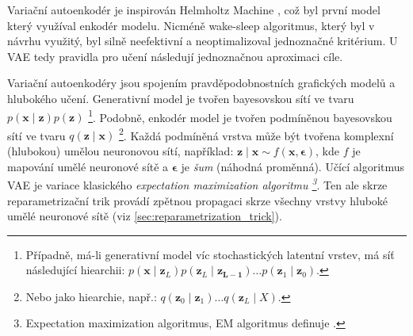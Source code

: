 Variační autoenkodér je inspirován Helmholtz Machine \cite{Dayan1995}, což byl první model který využíval enkodér modelu.
Nicméně wake-sleep algoritmus, který byl v návrhu využitý, byl silně neefektivní a neoptimalizoval jednoznačné kritérium.
U VAE tedy pravidla pro učení následují jednoznačnou aproximaci cíle. \cite{Kingma2019}

Variační autoenkodéry jsou spojením pravděpodobnostních grafických modelů a hlubokého učení.
Generativní model je tvořen bayesovskou sítí ve tvaru $p(\mathbf{x}\mid\mathbf{z})p(\mathbf{z})$
\footnote{Případně, má-li generativní model víc stochastických latentní vrstev, má síť následující hiearchii: $p(\mathbf{x}\mid\mathbf{z}_L) p(\mathbf{z}_L\mid\mathbf{z_{L-1}}) \dots p(\mathbf{z}_1\mid\mathbf{z}_0)$.}.
Podobně, enkodér model je tvořen podmíněnou bayesovskou sítí ve tvaru $q(\mathbf{z}\mid\mathbf{x})$
\footnote{Nebo jako hiearchie, např.: $q(\mathbf{z}_0\mid\mathbf{z}_1) \dots q(\mathbf{z}_L \mid X)$.}.
Každá podmíněná vrstva může být tvořena komplexní (hlubokou) umělou neuronovou sítí, například: $\mathbf{z}\mid\mathbf{x} \sim f(\mathbf{x}, \mathbf{\epsilon})$, kde $f$ je mapování umělé neuronové sítě a $\mathbf{\epsilon}$ je \emph{šum} (náhodná proměnná).
Učící algoritmus VAE je variace klasického \emph{expectation maximization algoritmu \footnote{Expectation maximization algoritmus, EM algoritmus definuje \textcite{Moon1996}.}}. Ten ale skrze reparametrizační trik provádí zpětnou propagaci skrze všechny vrstvy hluboké umělé neuronové sítě (viz \autoref{sec:reparametrization_trick}). \cite{Kingma2019}

\newpage

